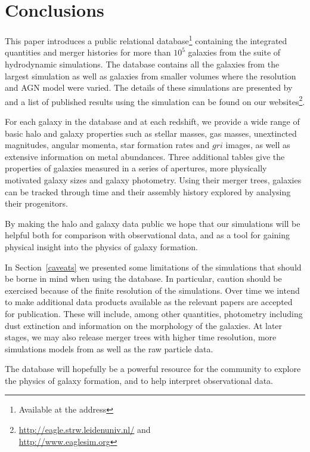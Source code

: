 \section{Conclusions}
\label{conclusion}
This paper introduces a public \sql relational database\footnote{Available at
  the address \dbAddress} containing the integrated quantities and merger
histories for more than $10^5$ galaxies from the \eagle suite of hydrodynamic
simulations. The database contains all the galaxies from the largest \eagle
simulation as well as galaxies from smaller volumes where the resolution and AGN
model were varied. The details of these simulations are presented by
\citet{Schaye2015} and a list of published results using the simulation can be
found on our websites\footnote{\url{http://eagle.strw.leidenuniv.nl/}
  and\\ \url{http://www.eaglesim.org}}.

For each galaxy in the database and at each redshift, we provide a wide range of
basic halo and galaxy properties such as stellar masses, gas masses, unextincted
magnitudes, angular momenta, star formation rates and $gri$ images, as well as
extensive information on metal abundances. Three additional tables give the
properties of galaxies measured in a series of apertures, more physically
motivated galaxy sizes and galaxy photometry. Using their merger trees, galaxies
can be tracked through time and their assembly history explored by analysing
their progenitors.

By making the halo and galaxy data public we hope that our simulations will be
helpful both for comparison with observational data, and as a tool for gaining
physical insight into the physics of galaxy formation. 

In Section~\ref{caveats} we presented some limitations of the simulations that
should be borne in mind when using the database. In particular, caution should
be exercised because of the finite resolution of the simulations. Over time we
intend to make additional data products available as the relevant papers are
accepted for publication. These will include, among other quantities, photometry
including dust extinction and information on the morphology of the galaxies. At
later stages, we may also release merger trees with higher time resolution, more
simulations models from \cite{Crain2015} as well as the raw particle data.

The \eagle database will hopefully be a powerful resource for the community to
explore the physics of galaxy formation, and to help interpret observational
data.

